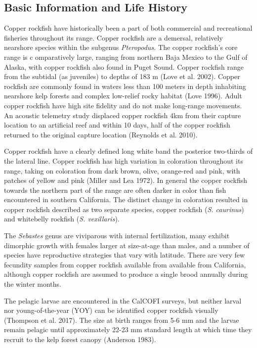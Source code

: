 \documentclass[11pt,
  english,
  letterpaper,
]{article}
\begin{document}
\hypertarget{basic-information-and-life-history}{%
\subsection{Basic Information and Life History}\label{basic-information-and-life-history}}

Copper rockfish have historically been a part of both commercial and recreational fisheries throughout its range. Copper rockfish are a demersal, relatively nearshore species within the subgenus \emph{Pteropodus.} The copper rockfish's core range is c omparatively large, ranging from northern Baja Mexico to the Gulf of Alaska, with copper rockfish also found in Puget Sound. Copper rockfish range from the subtidal (as juveniles) to depths of 183 m (Love et al. 2002). Copper rockfish are commonly found in waters less than 100 meters in depth inhabiting nearshore kelp forests and complex low-relief rocky habitat (Love 1996). Adult copper rockfish have high site fidelity and do not make long-range movements. An acoustic telemetry study displaced copper rockfish 4km from their capture location to an artificial reef and within 10 days, half of the copper rockfish returned to the original capture location (Reynolds et al. 2010).

Copper rockfish have a clearly defined long white band the posterior two-thirds of the lateral line. Copper rockfish has high variation in coloration throughout its range, taking on coloration from dark brown, olive, orange-red and pink, with patches of yellow and pink (Miller and Lea 1972). In general the copper rockfish towards the northern part of the range are often darker in color than fish encountered in southern California. The distinct change in coloration resulted in copper rockfish described as two separate species, copper rockfish (\emph{S. caurinus}) and whitebelly rockfish (\emph{S. vexillaris}).

The \emph{Sebastes} genus are viviparous with internal fertilization, many exhibit dimorphic growth with females larger at size-at-age than males, and a number of species have reproductive strategies that vary with latitude. There are very few fecundity samples from copper rockfish available from available from California, although copper rockfish are assumed to produce a single brood annually during the winter months.

The pelagic larvae are encountered in the CalCOFI surveys, but neither larval nor young-of-the-year (YOY) can be identified copper rockfish visually (Thompson et al. 2017). The size at birth ranges from 5-6 mm and the larvae remain pelagic until approximately 22-23 mm standard length at which time they recruit to the kelp forest canopy (Anderson 1983).
\end{document}
